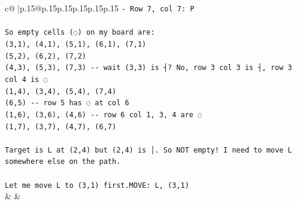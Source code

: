 \documentclass{article}
\begin{document}
{\begin{supertabular}{c@{$\;$}|p{.15\linewidth}@{}p{.15\linewidth}p{.15\linewidth}p{.15\linewidth}p{.15\linewidth}p{.15\linewidth}}
{{{\texttt{{-} Row 7, col 7: P} \\
\\ 
\texttt{So empty cells (◌) on my board are:} \\
\texttt{(3,1), (4,1), (5,1), (6,1), (7,1)} \\
\texttt{(5,2), (6,2), (7,2)} \\
\texttt{(4,3), (5,3), (7,3) {-}{-} wait (3,3) is ┤? No, row 3 col 3 is ┤, row 3 col 4 is ◌} \\
\texttt{(1,4), (3,4), (5,4), (7,4)} \\
\texttt{(6,5) {-}{-} row 5 has ◌ at col 6} \\
\texttt{(1,6), (3,6), (4,6) {-}{-} row 6 col 1, 3, 4 are ◌} \\
\texttt{(1,7), (3,7), (4,7), (6,7)} \\
\\ 
\texttt{Target is L at (2,4) but (2,4) is │. So NOT empty! I need to move L somewhere else on the path.} \\
\\ 
\texttt{Let me move L to (3,1) first.MOVE: L, (3,1)} \\
            }
        }
    }
    & & \\ \\


\end{supertabular}}
\end{document}

